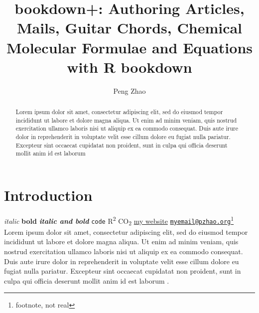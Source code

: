 \documentclass[bgd, online, hvmath]{style/copernicus}
\begin{document}
\sloppy

\title{bookdown+: Authoring Articles, Mails, Guitar Chords, Chemical Molecular
Formulae and Equations with R bookdown}

\author{Peng Zhao}






\maketitle

\begin{abstract}
Lorem ipsum dolor sit amet, consectetur adipiscing elit, sed do eiusmod
tempor incididunt ut labore et dolore magna aliqua. Ut enim ad minim
veniam, quis nostrud exercitation ullamco laboris nisi ut aliquip ex ea
commodo consequat. Duis aute irure dolor in reprehenderit in voluptate
velit esse cillum dolore eu fugiat nulla pariatur. Excepteur sint
occaecat cupidatat non proident, sunt in culpa qui officia deserunt
mollit anim id est laborum
\end{abstract}

\section{Introduction}\label{introduction}

\emph{italic} \textbf{bold} \textbf{\emph{italic and bold}}
\texttt{code} R\textsuperscript{2} CO\textsubscript{2}
\href{http://pzhao.org}{my website}
\href{mailto:myemail@pzhao.org}{\nolinkurl{myemail@pzhao.org}}\footnote{footnote,
  not real} \citet{R-base} Lorem ipsum dolor sit amet, consectetur
adipiscing elit, sed do eiusmod tempor incididunt ut labore et dolore
magna aliqua. Ut enim ad minim veniam, quis nostrud exercitation ullamco
laboris nisi ut aliquip ex ea commodo consequat. Duis aute irure dolor
in reprehenderit in voluptate velit esse cillum dolore eu fugiat nulla
pariatur. Excepteur sint occaecat cupidatat non proident, sunt in culpa
qui officia deserunt mollit anim id est laborum \citet{R-bookdown}.
\end{document}
